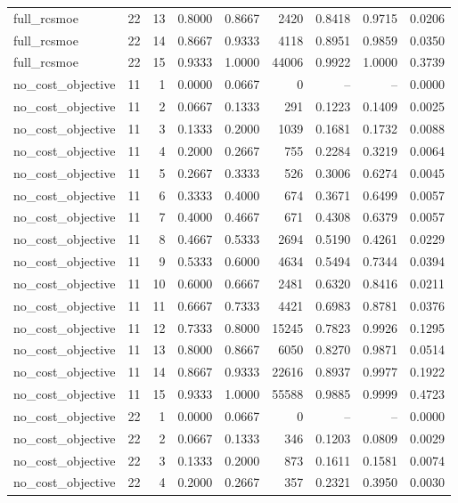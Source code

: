 \begin{tabular}{lrrrrrrrr}
full\_rcsmoe & 22 & 13 & 0.8000 & 0.8667 & 2420 & 0.8418 & 0.9715 & 0.0206 \\
full\_rcsmoe & 22 & 14 & 0.8667 & 0.9333 & 4118 & 0.8951 & 0.9859 & 0.0350 \\
full\_rcsmoe & 22 & 15 & 0.9333 & 1.0000 & 44006 & 0.9922 & 1.0000 & 0.3739 \\
no\_cost\_objective & 11 & 1 & 0.0000 & 0.0667 & 0 & -- & -- & 0.0000 \\
no\_cost\_objective & 11 & 2 & 0.0667 & 0.1333 & 291 & 0.1223 & 0.1409 & 0.0025 \\
no\_cost\_objective & 11 & 3 & 0.1333 & 0.2000 & 1039 & 0.1681 & 0.1732 & 0.0088 \\
no\_cost\_objective & 11 & 4 & 0.2000 & 0.2667 & 755 & 0.2284 & 0.3219 & 0.0064 \\
no\_cost\_objective & 11 & 5 & 0.2667 & 0.3333 & 526 & 0.3006 & 0.6274 & 0.0045 \\
no\_cost\_objective & 11 & 6 & 0.3333 & 0.4000 & 674 & 0.3671 & 0.6499 & 0.0057 \\
no\_cost\_objective & 11 & 7 & 0.4000 & 0.4667 & 671 & 0.4308 & 0.6379 & 0.0057 \\
no\_cost\_objective & 11 & 8 & 0.4667 & 0.5333 & 2694 & 0.5190 & 0.4261 & 0.0229 \\
no\_cost\_objective & 11 & 9 & 0.5333 & 0.6000 & 4634 & 0.5494 & 0.7344 & 0.0394 \\
no\_cost\_objective & 11 & 10 & 0.6000 & 0.6667 & 2481 & 0.6320 & 0.8416 & 0.0211 \\
no\_cost\_objective & 11 & 11 & 0.6667 & 0.7333 & 4421 & 0.6983 & 0.8781 & 0.0376 \\
no\_cost\_objective & 11 & 12 & 0.7333 & 0.8000 & 15245 & 0.7823 & 0.9926 & 0.1295 \\
no\_cost\_objective & 11 & 13 & 0.8000 & 0.8667 & 6050 & 0.8270 & 0.9871 & 0.0514 \\
no\_cost\_objective & 11 & 14 & 0.8667 & 0.9333 & 22616 & 0.8937 & 0.9977 & 0.1922 \\
no\_cost\_objective & 11 & 15 & 0.9333 & 1.0000 & 55588 & 0.9885 & 0.9999 & 0.4723 \\
no\_cost\_objective & 22 & 1 & 0.0000 & 0.0667 & 0 & -- & -- & 0.0000 \\
no\_cost\_objective & 22 & 2 & 0.0667 & 0.1333 & 346 & 0.1203 & 0.0809 & 0.0029 \\
no\_cost\_objective & 22 & 3 & 0.1333 & 0.2000 & 873 & 0.1611 & 0.1581 & 0.0074 \\
no\_cost\_objective & 22 & 4 & 0.2000 & 0.2667 & 357 & 0.2321 & 0.3950 & 0.0030 \\

\end{tabular}
